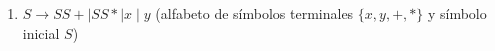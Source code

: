 \begin{ejercicio}
\begin{enumerate}
\begin{comment}
            \begin{equation*}
                \begin{aligned}
                    V &= \{ E, T\} \\
                    P &= \left\{
                        \begin{aligned}
                            E &\rightarrow E + T \mid E * T\mid T \\
                            T &\rightarrow (E) \mid x \mid y
                        \end{aligned}
                    \right.
                \end{aligned}
            \end{equation*}
        \end{comment}
        \item $S \rightarrow SS + \mid SS * \mid x \mid y$ (alfabeto de símbolos terminales $\{ x, y, +, * \}$ y símbolo inicial $S$)
        
    \end{enumerate}
\end{ejercicio}

